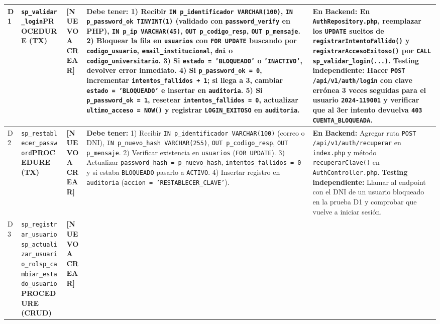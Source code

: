 \documentclass[10pt,a4paper,landscape]{article}
\newcommand{\stNuevo}{\textbf{\textcolor{red!75!black}{[NUEVO A CREAR]}}}
\newcommand{\objProcTx}{\textbf{\textcolor{unjbgNavy}{PROCEDURE (TX)}}}
\newcommand{\objProcCrud}{\textbf{\textcolor{unjbgBlue}{PROCEDURE (CRUD)}}}
\begin{document}
\begin{longtable}{|p{0.5cm}|p{3.8cm}|p{2.9cm}|p{8.8cm}|p{9.2cm}|}
D1 & \texttt{sp\_validar\_login}\newline \objProcTx & \stNuevo & 
\textbf{Debe tener:}
1) Recibir \texttt{IN p\_identificador VARCHAR(100)}, \texttt{IN p\_password\_ok TINYINT(1)} (validado con \texttt{password\_verify} en PHP), \texttt{IN p\_ip VARCHAR(45)}, \texttt{OUT p\_codigo\_resp}, \texttt{OUT p\_mensaje}.
2) Bloquear la fila en \texttt{usuarios} con \texttt{FOR UPDATE} buscando por \texttt{codigo\_usuario}, \texttt{email\_institucional}, \texttt{dni} o \texttt{codigo\_universitario}.
3) Si \texttt{estado = 'BLOQUEADO'} o \texttt{'INACTIVO'}, devolver error inmediato.
4) Si \texttt{p\_password\_ok = 0}, incrementar \texttt{intentos\_fallidos + 1}; si llega a 3, cambiar \texttt{estado = 'BLOQUEADO'} e insertar en \texttt{auditoria}.
5) Si \texttt{p\_password\_ok = 1}, resetear \texttt{intentos\_fallidos = 0}, actualizar \texttt{ultimo\_acceso = NOW()} y registrar \texttt{LOGIN\_EXITOSO} en \texttt{auditoria}. & 
\textbf{En Backend:} En \texttt{AuthRepository.php}, reemplazar los \texttt{UPDATE} sueltos de \texttt{registrarIntentoFallido()} y \texttt{registrarAccesoExitoso()} por \texttt{CALL sp\_validar\_login(...)}.\newline
\textbf{Testing independiente:} Hacer \texttt{POST /api/v1/auth/login} con clave errónea 3 veces seguidas para el usuario \texttt{2024-119001} y verificar que al 3er intento devuelva \texttt{403 CUENTA\_BLOQUEADA}. \\
\hline
\rowcolor{rowAlt}
D2 & \texttt{sp\_restablecer\_password}\newline \objProcTx & \stNuevo & 
\textbf{Debe tener:}
1) Recibir \texttt{IN p\_identificador VARCHAR(100)} (correo o DNI), \texttt{IN p\_nuevo\_hash VARCHAR(255)}, \texttt{OUT p\_codigo\_resp}, \texttt{OUT p\_mensaje}.
2) Verificar existencia en \texttt{usuarios} (\texttt{FOR UPDATE}).
3) Actualizar \texttt{password\_hash = p\_nuevo\_hash}, \texttt{intentos\_fallidos = 0} y si estaba \texttt{BLOQUEADO} pasarlo a \texttt{ACTIVO}.
4) Insertar registro en \texttt{auditoria} (\texttt{accion = 'RESTABLECER\_CLAVE'}). & 
\textbf{En Backend:} Agregar ruta \texttt{POST /api/v1/auth/recuperar} en \texttt{index.php} y método \texttt{recuperarClave()} en \texttt{AuthController.php}.\newline
\textbf{Testing independiente:} Llamar al endpoint con el DNI de un usuario bloqueado en la prueba D1 y comprobar que vuelve a iniciar sesión. \\
\hline
D3 & \texttt{sp\_registrar\_usuario}\newline \texttt{sp\_actualizar\_usuario\_rol}\newline \texttt{sp\_cambiar\_estado\_usuario}\newline \objProcCrud & \stNuevo & 

\end{longtable}
\end{document}
